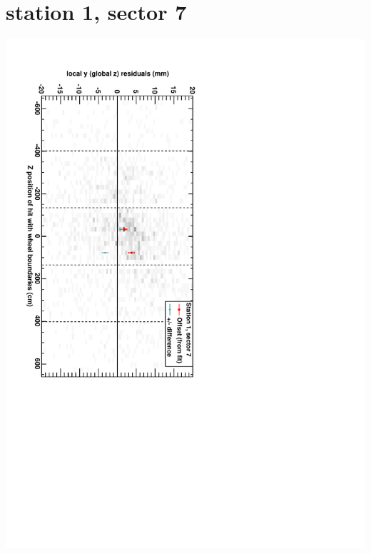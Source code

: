 \documentclass[compress]{beamer}
\begin{document}
\section*{station 1, sector 7}
\begin{frame} \vfill \mbox{\hspace{-1 cm}\includegraphics[height=1.2\linewidth, angle=90]{DTzVsZ_st1_sr07.pdf}} \end{frame}
\end{document}

